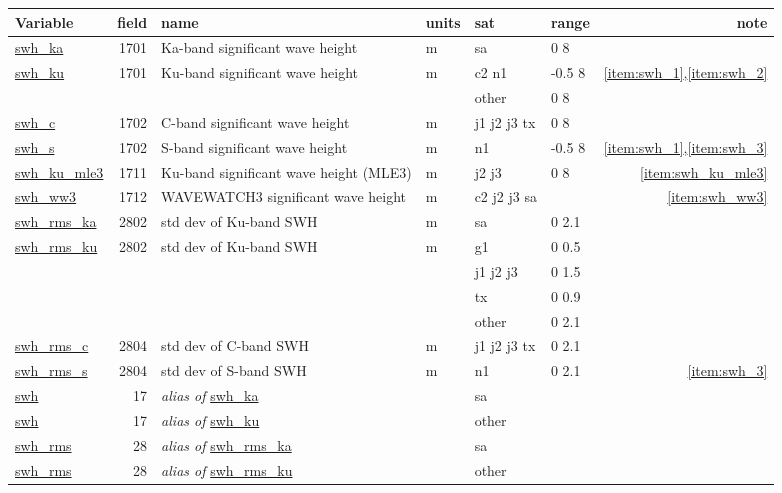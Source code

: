 \documentclass[a4paper,11pt,openany,natbib,nomargin]{thesis}
\makeatletter
\newcommand\var[1]{\url{#1}\index{variables!#1@\protect\url{#1}}}
\newcommand\alias[1]{\emph{alias of} \var{#1}}
\newenvironment{vartable}{
\begin{table}[ht]
\small
\begin{tabular}{lrllllr}
\hline
Variable & field & name & units & sat & range & note \\
\hline
}{
\hline
\end{tabular}
\end{table}
}
\makeatother
\begin{document}
\begin{vartable}
\var{swh_ka} & 1701 & Ka-band significant wave height & m & sa & 0 8 & \\
\var{swh_ku} & 1701 & Ku-band significant wave height & m & c2 n1 & -0.5 8 & \ref{item:swh_1},\ref{item:swh_2} \\
& & & & other & 0 8 & \\
\var{swh_c} & 1702 & C-band significant wave height & m & j1 j2 j3 tx & 0 8 & \\
\var{swh_s} & 1702 & S-band significant wave height & m & n1 & -0.5 8 & \ref{item:swh_1},\ref{item:swh_3} \\
\var{swh_ku_mle3} & 1711 & Ku-band significant wave height (MLE3) & m & j2 j3 & 0 8 & \ref{item:swh_ku_mle3} \\
\hline
\var{swh_ww3} & 1712 & WAVEWATCH3 significant wave height & m & c2 j2 j3 sa & & \ref{item:swh_ww3} \\
\hline
\var{swh_rms_ka} & 2802 & std dev of Ku-band SWH & m & sa & 0 2.1 & \\
\var{swh_rms_ku} & 2802 & std dev of Ku-band SWH & m & g1 & 0 0.5 & \\
& & & & j1 j2 j3 & 0 1.5 & \\
& & & & tx & 0 0.9 & \\
& & & & other & 0 2.1 & \\
\var{swh_rms_c} & 2804 & std dev of C-band SWH & m & j1 j2 j3 tx & 0 2.1 & \\
\var{swh_rms_s} & 2804 & std dev of S-band SWH & m & n1 & 0 2.1 & \ref{item:swh_3} \\
\hline
\var{swh} & 17 & \alias{swh_ka} && sa && \\
\var{swh} & 17 & \alias{swh_ku} && other && \\
\hline
\var{swh_rms} & 28 & \alias{swh_rms_ka} && sa && \\
\var{swh_rms} & 28 & \alias{swh_rms_ku} && other && \\
\end{vartable}
\end{document}

